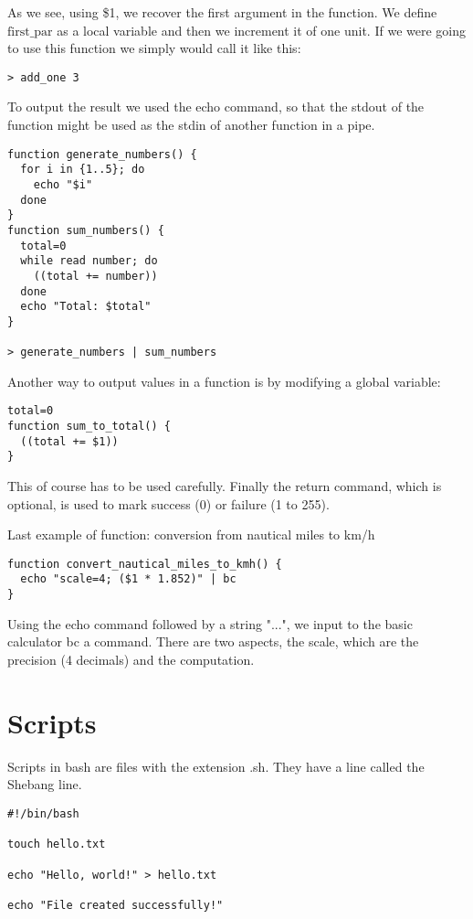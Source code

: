\documentclass[24pt]{article}
\begin{document}
As we see, using \$1, we recover the first argument in the function. We define $\text{first\_par}$ as a local variable and then we increment it of one unit. If we were going to use this function we simply would call it like this:
\begin{lstlisting}
> add_one 3
\end{lstlisting}

To output the result we used the echo command, so that the stdout of the function might be used as the stdin of another function in a pipe.

\begin{lstlisting}
function generate_numbers() {
  for i in {1..5}; do
    echo "$i"
  done
}
function sum_numbers() {
  total=0
  while read number; do
    ((total += number))
  done
  echo "Total: $total"
}

> generate_numbers | sum_numbers
\end{lstlisting}

Another way to output values in a function is by modifying a global variable:
\begin{lstlisting}
total=0
function sum_to_total() {
  ((total += $1))
}
\end{lstlisting}

This of course has to be used carefully.
Finally the return command, which is optional, is used to mark success (0) or failure (1 to 255). 

Last example of function: conversion from nautical miles to km/h

\begin{lstlisting}
function convert_nautical_miles_to_kmh() {
  echo "scale=4; ($1 * 1.852)" | bc
}
\end{lstlisting}

Using the echo command followed by a string "...", we input to the basic calculator bc a command. There are two aspects, the scale, which are the precision (4 decimals) and the computation.


\section{Scripts}
Scripts in bash are files with the extension .sh. They  have a line called the Shebang line.

\begin{lstlisting}
#!/bin/bash

touch hello.txt

echo "Hello, world!" > hello.txt

echo "File created successfully!"
\end{lstlisting}
\end{document}
